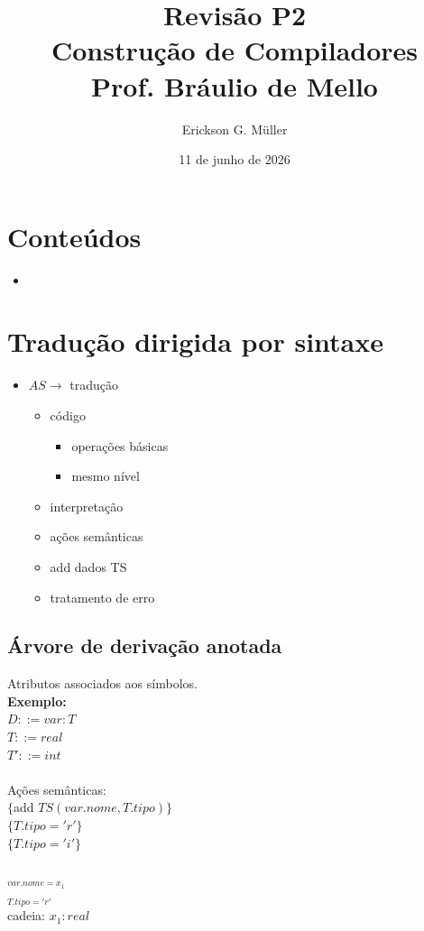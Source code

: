 \documentclass[ 12pt, a4paper]{article}
\title{Revisão P2\\Construção de Compiladores\\Prof. Bráulio de Mello}
\author{Erickson G. Müller}
\date{11 de junho de 2026}
\begin{document}
\maketitle
\section*{Conteúdos}
	\begin{itemize}
		\item
	\end{itemize}
\newpage

\section{Tradução dirigida por sintaxe}
\begin{itemize}
	\item $AS \to $ tradução
	\begin{itemize}
		\item código
			\begin{itemize}
				\item operações básicas
				\item mesmo nível
			\end{itemize}
		\item interpretação
		\item ações semânticas
		\item add dados TS
		\item tratamento de erro
	\end{itemize}
\end{itemize}
	\subsection{Árvore de derivação anotada}

	Atributos associados aos símbolos.\\
	\textbf{Exemplo:}\\
		$D::= var: T$\\
		$T::= real$\\
		$T'::= int$\\
		\\
		Ações semânticas:\\
		$\{$add $TS(var.nome, T.tipo)\}$\\
		$\{T.tipo='r'\}$\\
		$\{T.tipo='i'\}$\\
		\\
		$_{var.nome=x_1}$\\
		$_{T.tipo = 'r'}$\\
		cadeia: $x_1:real$
\end{document}

